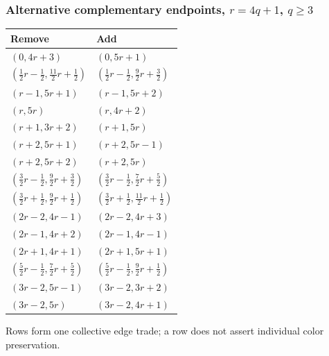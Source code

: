\subsubsection[Alternative complementary endpoints, r=4q+1, q >= 3]{Alternative complementary endpoints, $r=4q+1$, $q\ge3$}
\label{templates:alt}
\begingroup\small
\begin{longtable}{ll}
Remove & Add\\\hline\endhead
$(0,4r+3)$ & $(0,5r+1)$\\
$(\frac{1}{2}r-\frac{1}{2},\frac{11}{2}r+\frac{1}{2})$ & $(\frac{1}{2}r-\frac{1}{2},\frac{9}{2}r+\frac{3}{2})$\\
$(r-1,5r+1)$ & $(r-1,5r+2)$\\
$(r,5r)$ & $(r,4r+2)$\\
$(r+1,3r+2)$ & $(r+1,5r)$\\
$(r+2,5r+1)$ & $(r+2,5r-1)$\\
$(r+2,5r+2)$ & $(r+2,5r)$\\
$(\frac{3}{2}r-\frac{1}{2},\frac{9}{2}r+\frac{3}{2})$ & $(\frac{3}{2}r-\frac{1}{2},\frac{7}{2}r+\frac{5}{2})$\\
$(\frac{3}{2}r+\frac{1}{2},\frac{9}{2}r+\frac{1}{2})$ & $(\frac{3}{2}r+\frac{1}{2},\frac{11}{2}r+\frac{1}{2})$\\
$(2r-2,4r-1)$ & $(2r-2,4r+3)$\\
$(2r-1,4r+2)$ & $(2r-1,4r-1)$\\
$(2r+1,4r+1)$ & $(2r+1,5r+1)$\\
$(\frac{5}{2}r-\frac{1}{2},\frac{7}{2}r+\frac{5}{2})$ & $(\frac{5}{2}r-\frac{1}{2},\frac{9}{2}r+\frac{1}{2})$\\
$(3r-2,5r-1)$ & $(3r-2,3r+2)$\\
$(3r-2,5r)$ & $(3r-2,4r+1)$\\
\end{longtable}
Rows form one collective edge trade; a row does not assert individual color preservation.
